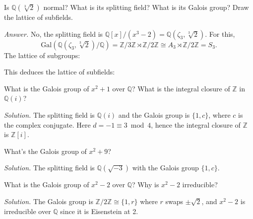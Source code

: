 \documentclass{mathproblems}
\newcommand\Q{\mathbb{Q}}
\newcommand\Z{\mathbb{Z}}
\newcommand\Gal{\mathrm{Gal}}
\begin{document}
\begin{questions}
\miquestion
{\color{blue} Is $\Q(\sqrt[3]{2})$ normal? What is its splitting field? What is its Galois group? Draw the lattice of subfields.}

\textit{Answer.}
No, the splitting field is $\Q[x]/(x^3-2)=\Q(\zeta_3, \sqrt[3]{2})$. For this,
$$
\Gal(\Q(\zeta_3, \sqrt[3]{2})/\Q)=\Z/3\Z \rtimes \Z/2\Z\cong A_3 \rtimes \Z/2\Z=S_3.
$$
The lattice of subgroups:
\begin{center}
\end{center}
This deduces the lattice of subfields:
\begin{center}
\end{center}


\miquestion
{\color{blue} What is the Galois group of $x^2+1$ over $\Q$? What is the integral closure of $\Z$ in $\Q(i)$?}

\textit{Solution.}
The splitting field is $\Q(i)$ and the Galois group is $\{1,c\}$, where $c$ is the complex conjugate. Here $d=-1\equiv 3\bmod 4$, hence the integral closure of $\Z$ is $\Z[i]$.

\miquestion
{\color{blue} What's the Galois group of $x^{2}+9$?}

\textit{Solution.} The splitting field is $\Q(\sqrt{-3})$ with the Galois group $\{1,c\}$.

\miquestion
{\color{blue} What is the Galois group of $x^{2}-2$ over $\Q$? Why is $x^{2}-2$ irreducible?}

\textit{Solution.}
The Galois group is $\Z/2\Z\cong \{1,r\}$ where $r$ swaps $\pm\sqrt{2}$, and $x^{2}-2$ is irreducible over $\Q$ since it is Eisenstein at 2.


\end{questions}
\end{document}

